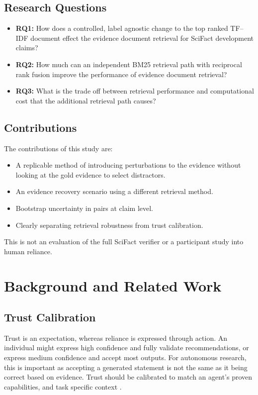 \documentclass[11pt,a4paper]{article}
\begin{document}
\subsection{Research Questions}

\begin{itemize}[leftmargin=1.5em]
    \item \textbf{RQ1:} How does a controlled, label agnostic change to the top ranked TF--IDF document effect the evidence document retrieval for SciFact development claims?
    \item \textbf{RQ2:} How much can an independent BM25 retrieval path with reciprocal rank fusion improve the performance of evidence document retrieval?
    \item \textbf{RQ3:} What is the trade off between retrieval performance and computational cost that the additional retrieval path causes?
\end{itemize}

\subsection{Contributions}

The contributions of this study are:
\begin{itemize}[leftmargin=1.5em]
    \item A replicable method of introducing perturbations to the evidence without looking at the gold evidence to select distractors.
    \item An evidence recovery scenario using a different retrieval method.
    \item Bootstrap uncertainty in pairs at claim level.
    \item Clearly separating retrieval robustness from trust calibration.
\end{itemize}

This is not an evaluation of the full SciFact verifier or a participant study into human reliance.

\section{Background and Related Work}

\subsection{Trust Calibration}

Trust is an expectation, whereas reliance is expressed through action. An individual might express high confidence and fully validate recommendations, or express medium confidence and accept most outputs. For autonomous research, this is important as accepting a generated statement is not the same as it being correct based on evidence. Trust should be calibrated to match an agent's proven capabilities, and task specific context \citep{lee2004,hoff2015}.
\end{document}
